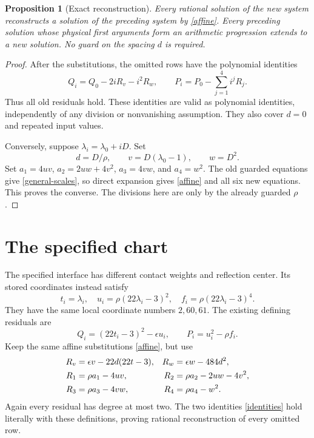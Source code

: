 \documentclass[11pt]{article}
\newtheorem{proposition}[theorem]{Proposition}
\begin{document}
\begin{proposition}[Exact reconstruction]\label{reconstruction}
Every rational solution of the new system reconstructs a solution of
the preceding system by \eqref{affine}. Every preceding solution whose
physical first arguments form an arithmetic progression extends to a
new solution. No guard on the spacing $d$ is required.
\end{proposition}
\begin{proof}
After the substitutions, the omitted rows have the polynomial identities
\begin{equation}\label{identities}
 Q_i=Q_0-2iR_v-i^2R_w,
 \qquad
 P_i=P_0-\sum_{j=1}^4i^jR_j.
\end{equation}
Thus all old residuals hold. These identities are valid as polynomial
identities, independently of any division or nonvanishing assumption.
They also cover $d=0$ and repeated input values.

Conversely, suppose $\lambda_i=\lambda_0+iD$. Set
\[
 d=D/\rho,\qquad v=D(\lambda_0-1),\qquad w=D^2.
\]
Set $a_1=4uv$, $a_2=2uw+4v^2$, $a_3=4vw$, and $a_4=w^2$.
The old guarded equations give \eqref{general-scales}, so direct
expansion gives \eqref{affine} and all six new equations. This proves
the converse. The divisions here are only by the already guarded
$\rho$.
\end{proof}

\section{The specified chart}

The specified interface has different contact weights and reflection
center. Its stored coordinates instead satisfy
\begin{equation}\label{specified-scales}
 t_i=\lambda_i,\quad
 u_i=\rho(22\lambda_i-3)^2,\quad
 f_i=\rho(22\lambda_i-3)^4.
\end{equation}
They have the same local coordinate numbers $2,60,61$. The existing
defining residuals are
\[
 Q_i=(22t_i-3)^2-\epsilon u_i,
 \qquad P_i=u_i^2-\rho f_i.
\]
Keep the same affine substitutions \eqref{affine}, but use
\begin{align}
 R_v&=\epsilon v-22d(22t-3),&
 R_w&=\epsilon w-484d^2,\label{specified-mixed}\\
 R_1&=\rho a_1-4uv,&
 R_2&=\rho a_2-2uw-4v^2,\label{specified-fourth}\\
 R_3&=\rho a_3-4vw,&
 R_4&=\rho a_4-w^2.\notag
\end{align}
Again every residual has degree at most two. The two identities
\eqref{identities} hold literally with these definitions, proving
rational reconstruction of every omitted row.
\end{document}

